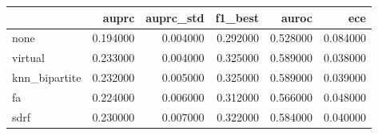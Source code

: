 \begin{tabular}{lrrrrr}
\toprule
 & auprc & auprc_std & f1_best & auroc & ece \\
\midrule
none & 0.194000 & 0.004000 & 0.292000 & 0.528000 & 0.084000 \\
virtual & 0.233000 & 0.004000 & 0.325000 & 0.589000 & 0.038000 \\
knn_bipartite & 0.232000 & 0.005000 & 0.325000 & 0.589000 & 0.039000 \\
fa & 0.224000 & 0.006000 & 0.312000 & 0.566000 & 0.048000 \\
sdrf & 0.230000 & 0.007000 & 0.322000 & 0.584000 & 0.040000 \\
\bottomrule
\end{tabular}
